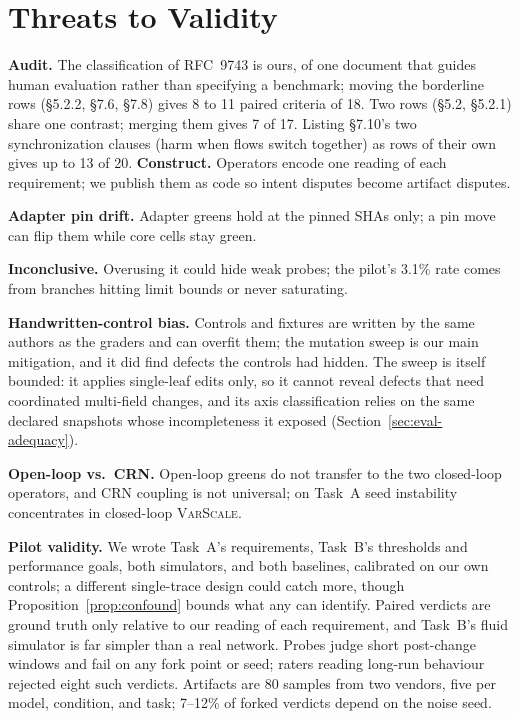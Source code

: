 \documentclass[conference]{IEEEtran}
\begin{document}
	\section{Threats to Validity}
	\label{sec:threats}
	
	\textbf{Audit.} The classification of RFC~9743 is ours, of one document
	that guides human evaluation rather than specifying a benchmark; moving
	the borderline rows (\S5.2.2, \S7.6, \S7.8) gives 8 to 11 paired
	criteria of 18. Two rows (\S5.2, \S5.2.1) share one contrast; merging
	them gives 7 of 17. Listing \S7.10's two synchronization clauses (harm
	when flows switch together) as rows of their own gives up to 13 of 20.
	\textbf{Construct.} Operators encode one reading of each requirement; we
	publish them as code so intent disputes become artifact disputes.
	
	\textbf{Adapter pin drift.} Adapter greens hold at the pinned SHAs only;
	a pin move can flip them while core cells stay green.
	
	\textbf{Inconclusive.} Overusing it could hide weak probes; the pilot's
	3.1\% rate comes from branches hitting limit bounds or never saturating.
	
	\textbf{Handwritten-control bias.} Controls and fixtures are written by the
	same authors as the graders and can overfit them; the mutation sweep is
	our main mitigation, and it did find defects the controls had hidden. The
	sweep is itself bounded: it applies single-leaf edits only, so it cannot
	reveal defects that need coordinated multi-field changes, and its axis
	classification relies on the same declared snapshots whose
	incompleteness it exposed (Section~\ref{sec:eval-adequacy}).
	
	\textbf{Open-loop vs.\ CRN.} Open-loop greens do not transfer to the
	two closed-loop operators, and CRN coupling is not universal; on Task~A
	seed instability concentrates in closed-loop \textsc{VarScale}.
	
	\textbf{Pilot validity.} We wrote Task~A's requirements, Task~B's
	thresholds and performance goals, both simulators, and both baselines,
	calibrated on our own controls; a different single-trace design could
	catch more, though Proposition~\ref{prop:confound} bounds what any can
	identify. Paired verdicts are ground truth only relative to our reading
	of each requirement, and Task~B's fluid simulator is far simpler than a
	real network. Probes judge short post-change windows and fail on any
	fork point or seed; raters reading long-run behaviour rejected eight
	such verdicts. Artifacts are 80 samples from two vendors, five per model,
	condition, and task; 7--12\% of forked verdicts depend on the noise
	seed.
\end{document}

